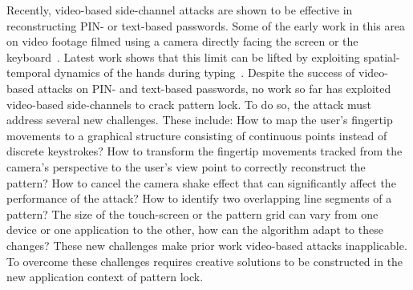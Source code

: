 Recently, video-based side-channel attacks are shown to be effective in reconstructing PIN- or
text-based passwords. Some of the early work in this area  on video
footage filmed using a camera directly facing the screen or the keyboard~\cite{
kuhn2002compromising, balzarotti2008clearshot}. Latest work shows that
this limit can be lifted by exploiting spatial-temporal dynamics of
the hands during typing~\cite{shukla2014beware}.
Despite the success of
video-based attacks on PIN- and text-based passwords, no work so far has
exploited video-based side-channels to crack pattern lock.
To do so, the attack must address several new challenges. These include: How to map the user's fingertip
movements to a graphical structure consisting of continuous points instead of discrete
keystrokes? How to transform the fingertip movements tracked from
the camera's perspective to the user's view point to correctly reconstruct the
pattern? How to cancel the camera shake effect that can significantly
affect the performance of the attack? How to identify two overlapping line segments
of a pattern? The size of the touch-screen or the pattern grid
can vary from one device or one application to the other, how can the algorithm
adapt to these changes?
These new challenges make prior work video-based attacks inapplicable.
To overcome these challenges requires creative
solutions to be constructed in the new application context of pattern lock.



